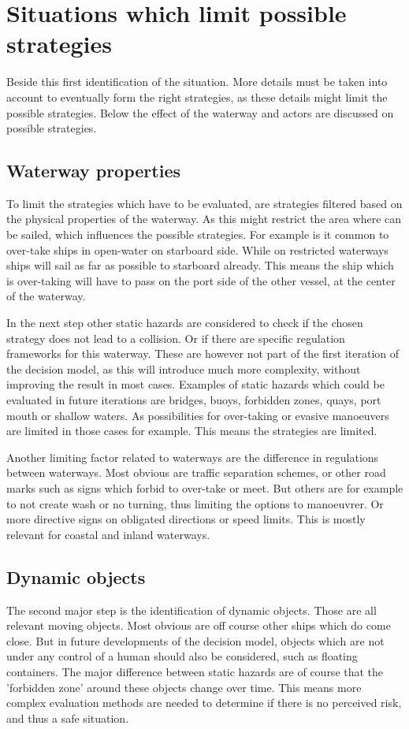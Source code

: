 \section{Situations which limit possible strategies}
Beside this first identification of the situation. More details must be taken into account to eventually form the right strategies, as these details might limit the possible strategies. Below the effect of the waterway and actors are discussed on possible strategies.

\subsection{Waterway properties}
To limit the strategies which have to be evaluated, are strategies filtered based on the physical properties of the waterway. As this might restrict the area where can be sailed, which influences the possible strategies. For example is it common to over-take ships in open-water on starboard side. While on restricted waterways ships will sail as far as possible to starboard already. This means the ship which is over-taking will have to pass on the port side of the other vessel, at the center of the waterway.

In the next step other static hazards are considered to check if the chosen strategy does not lead to a collision. Or if there are specific regulation frameworks for this waterway. These are however not part of the first iteration of the decision model, as this will introduce much more complexity, without improving the result in most cases. Examples of static hazards which could be evaluated in future iterations are bridges, buoys, forbidden zones, quays, port mouth or shallow waters. As possibilities for over-taking or evasive manoeuvers are limited in those cases for example. This means the strategies are limited.

Another limiting factor related to waterways are the difference in regulations between waterways. Most obvious are traffic separation schemes, or other road marks such as signs which forbid to over-take or meet. But others are for example to not create wash or no turning, thus limiting the options to manoeuvrer. Or more directive signs on obligated directions or speed limits. This is mostly relevant for coastal and inland waterways.

\subsection{Dynamic objects}
The second major step is the identification of dynamic objects. Those are all relevant moving objects. Most obvious are off course other ships which do come close. But in future developments of the decision model, objects which are not under any control of a human should also be considered, such as floating containers. The major difference between static hazards are of course that the 'forbidden zone' around these objects change over time. This means more complex evaluation methods are needed to determine if there is no perceived risk, and thus a safe situation.

